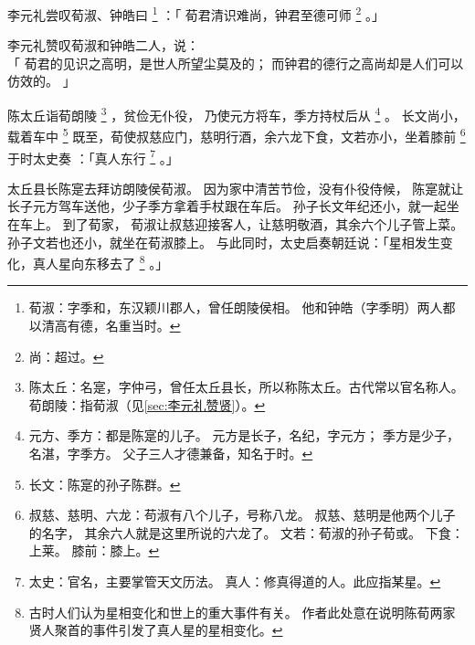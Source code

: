 \begin{paracol}{2}
\switchcolumn*[\section{}\label{sec:李元礼赞贤}]

李元礼尝叹荀淑、钟皓曰%
\footnote{%
    荀淑：字季和，东汉颖川郡人，曾任朗陵侯相。
          他和钟皓（字季明）两人都以清高有德，名重当时。
}%
：「
    荀君清识难尚，钟君至德可师%
    \footnote{%
        尚：超过。
    }%
。」

\switchcolumn

李元礼赞叹荀淑和钟皓二人，说：\\「
    荀君的见识之高明，是世人所望尘莫及的；
    而钟君的德行之高尚却是人们可以仿效的。
」


\switchcolumn*[\section{}]

陈太丘诣荀朗陵%
\footnote{%
    陈太丘：名寔，字仲弓，曾任太丘县长，所以称陈太丘。古代常以官名称人。
    荀朗陵：指荀淑（见\ref{sec:李元礼赞贤}）。
}%
，贫俭无仆役，
乃使元方将车，季方持杖后从%
\footnote{%
    元方、季方：都是陈寔的儿子。
                元方是长子，名纪，字元方；
                季方是少子，名湛，字季方。
                父子三人才德兼备，知名于时。
}%
。
长文尚小，载着车中%
\footnote{%
    长文：陈寔的孙子陈群。
}%
既至，荀使叔慈应门，慈明行酒，余六龙下食，文若亦小，坐着膝前%
\footnote{%
    叔慈、慈明、六龙：苟淑有八个儿子，号称八龙。
                      叔慈、慈明是他两个儿子的名字，
                      其余六人就是这里所说的六龙了。
    文若：荀淑的孙子荀或。
    下食：上莱。
    膝前：膝上。
}%
于时太史奏 ：「真人东行%
\footnote{%
    太史：官名，主要掌管天文历法。
    真人：修真得道的人。此应指某星。
}%
。」

\switchcolumn

太丘县长陈寔去拜访朗陵侯荀淑。
因为家中清苦节俭，没有仆役侍候，
陈寔就让长子元方驾车送他，少子季方拿着手杖跟在车后。
孙子长文年纪还小，就一起坐在车上。
到了荀家，
荀淑让叔慈迎接客人，让慈明敬酒，其余六个儿子管上菜。
孙子文若也还小，就坐在荀淑膝上。
与此同时，太史启奏朝廷说：「星相发生变化，真人星向东移去了%
\footnote{%
    古时人们认为星相变化和世上的重大事件有关。
    作者此处意在说明陈荀两家贤人聚首的事件引发了真人星的星相变化。
}%
。」



\end{paracol}
